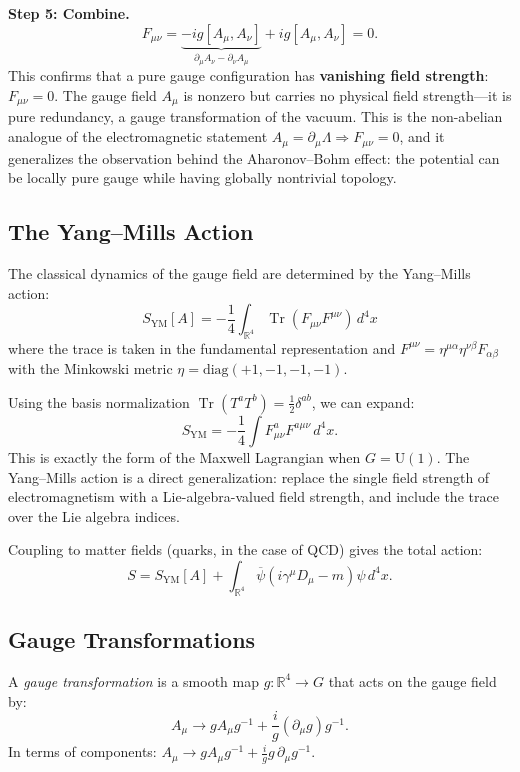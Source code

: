 \begin{example}
\textbf{Step 5: Combine.}
\[
F_{\mu\nu} = \underbrace{-ig[A_\mu, A_\nu]}_{\partial_\mu A_\nu - \partial_\nu A_\mu} + ig[A_\mu, A_\nu] = 0.
\]
This confirms that a pure gauge configuration has \textbf{vanishing field strength}: $F_{\mu\nu} = 0$. The gauge field $A_\mu$ is nonzero but carries no physical field strength---it is pure redundancy, a gauge transformation of the vacuum. This is the non-abelian analogue of the electromagnetic statement $A_\mu = \partial_\mu \Lambda \Rightarrow F_{\mu\nu} = 0$, and it generalizes the observation behind the Aharonov--Bohm effect: the potential can be locally pure gauge while having globally nontrivial topology.
\end{example}

\subsection{The Yang--Mills Action}

The classical dynamics of the gauge field are determined by the Yang--Mills action:
\[
S_{\mathrm{YM}}[A] = -\frac{1}{4} \int_{\mathbb{R}^4} \operatorname{Tr}(F_{\mu\nu} F^{\mu\nu}) \, d^4x
\]
where the trace is taken in the fundamental representation and $F^{\mu\nu} = \eta^{\mu\alpha}\eta^{\nu\beta}F_{\alpha\beta}$ with the Minkowski metric $\eta = \mathrm{diag}(+1, -1, -1, -1)$.

Using the basis normalization $\operatorname{Tr}(T^a T^b) = \frac{1}{2}\delta^{ab}$, we can expand:
\[
S_{\mathrm{YM}} = -\frac{1}{4} \int F_{\mu\nu}^a F^{a\mu\nu} \, d^4x.
\]
This is exactly the form of the Maxwell Lagrangian when $G = \mathrm{U}(1)$. The Yang--Mills action is a direct generalization: replace the single field strength of electromagnetism with a Lie-algebra-valued field strength, and include the trace over the Lie algebra indices.

Coupling to matter fields (quarks, in the case of QCD) gives the total action:
\[
S = S_{\mathrm{YM}}[A] + \int_{\mathbb{R}^4} \overline{\psi}(i\gamma^\mu D_\mu - m)\psi \, d^4x.
\]

\subsection{Gauge Transformations}

\begin{definition}
A \textit{gauge transformation} is a smooth map $g: \mathbb{R}^4 \to G$ that acts on the gauge field by:
\[
A_\mu \to g A_\mu g^{-1} + \frac{i}{g}(\partial_\mu g) g^{-1}.
\]
In terms of components: $A_\mu \to g A_\mu g^{-1} + \frac{i}{g} g \, \partial_\mu g^{-1}$.
\end{definition}

